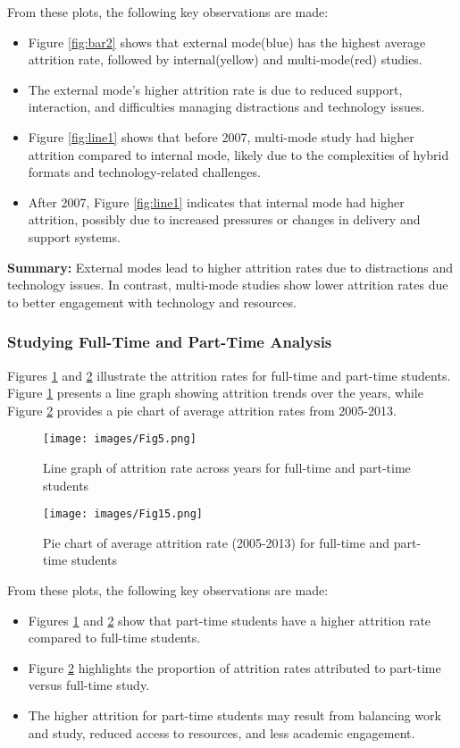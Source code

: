 \documentclass[conference]{IEEEtran}
\begin{document}
From these plots, the following key observations are made:
\begin{itemize} 
    \item Figure \ref{fig:bar2} shows that external mode(blue) has the highest average attrition rate, followed by internal(yellow) and multi-mode(red) studies.
    \item The external mode's higher attrition rate is due to reduced support, interaction, and difficulties managing distractions and technology issues.
    \item Figure \ref{fig:line1} shows that before 2007, multi-mode study had higher attrition compared to internal mode, likely due to the complexities of hybrid formats and technology-related challenges.
    \item After 2007, Figure \ref{fig:line1} indicates that internal mode had higher attrition, possibly due to increased pressures or changes in delivery and support systems.
\end{itemize}

\textbf{Summary:} External modes lead to higher attrition rates due to distractions and technology issues. In contrast, multi-mode studies show lower attrition rates due to better engagement with technology and resources.

\subsubsection{Studying Full-Time and Part-Time Analysis}
Figures \ref{fig:line2} and \ref{fig:pie2} illustrate the attrition rates for full-time and part-time students. Figure \ref{fig:line2} presents a line graph showing attrition trends over the years, while Figure \ref{fig:pie2} provides a pie chart of average attrition rates from 2005-2013.

\begin{figure}[H]
    \centering
    \texttt{[image: images/Fig5.png]}
    \caption{Line graph of attrition rate across years for full-time and part-time students}
    \label{fig:line2}    
\end{figure}

\begin{figure}[H]
    \centering
    \texttt{[image: images/Fig15.png]}
    \caption{Pie chart of average attrition rate (2005-2013) for full-time and part-time students}
    \label{fig:pie2}    
\end{figure}

From these plots, the following key observations are made:
\begin{itemize} 
    \item Figures \ref{fig:line2} and \ref{fig:pie2} show that part-time students have a higher attrition rate compared to full-time students.
    \item Figure \ref{fig:pie2} highlights the proportion of attrition rates attributed to part-time versus full-time study.
    \item The higher attrition for part-time students may result from balancing work and study, reduced access to resources, and less academic engagement.
\end{itemize}
\end{document}
